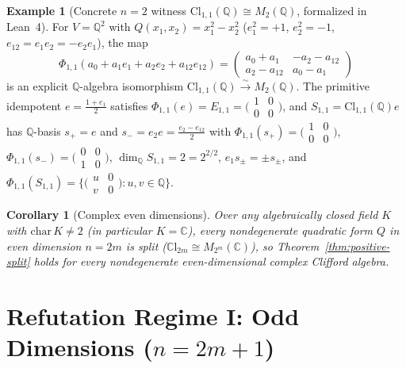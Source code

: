 \documentclass[11pt,a4paper]{article}
\theoremstyle{plain}
\newtheorem{corollary}[theorem]{Corollary}
\theoremstyle{definition}
\newtheorem{example}[theorem]{Example}
\theoremstyle{remark}
\newcommand{\Cl}{\mathrm{Cl}}
\newcommand{\CCl}{\mathbb{C}\mathrm{l}}
\begin{document}
\begin{example}[Concrete $n = 2$ witness $\Cl_{1,1}(\mathbb{Q}) \cong M_2(\mathbb{Q})$, formalized in Lean~4]\label{ex:cl11}
For $V = \mathbb{Q}^2$ with $Q(x_1, x_2) = x_1^2 - x_2^2$ ($e_1^2 = +1$, $e_2^2 = -1$, $e_{12} = e_1 e_2 = -e_2 e_1$), the map
\[
  \Phi_{1,1}(a_0 + a_1 e_1 + a_2 e_2 + a_{12} e_{12}) =
  \begin{pmatrix}
    a_0 + a_1 & -a_2 - a_{12} \\
    a_2 - a_{12} & a_0 - a_1
  \end{pmatrix}
\]
is an explicit $\mathbb{Q}$-algebra isomorphism $\Cl_{1,1}(\mathbb{Q}) \xrightarrow{\sim} M_2(\mathbb{Q})$. The primitive idempotent $e = \frac{1 + e_1}{2}$ satisfies $\Phi_{1,1}(e) = E_{1,1} = \bigl(\begin{smallmatrix}1&0\\0&0\end{smallmatrix}\bigr)$, and $S_{1,1} = \Cl_{1,1}(\mathbb{Q}) e$ has $\mathbb{Q}$-basis $s_+ = e$ and $s_- = e_2 e = \frac{e_2 - e_{12}}{2}$ with $\Phi_{1,1}(s_+) = \bigl(\begin{smallmatrix}1&0\\0&0\end{smallmatrix}\bigr)$, $\Phi_{1,1}(s_-) = \bigl(\begin{smallmatrix}0&0\\1&0\end{smallmatrix}\bigr)$, $\dim_{\mathbb{Q}} S_{1,1} = 2 = 2^{2/2}$, $e_1 s_\pm = \pm s_\pm$, and $\Phi_{1,1}(S_{1,1}) = \bigl\{\bigl(\begin{smallmatrix}u&0\\v&0\end{smallmatrix}\bigr) : u,v \in \mathbb{Q}\bigr\}$.
\end{example}

\begin{corollary}[Complex even dimensions]\label{cor:complex-even}
Over any algebraically closed field $K$ with $\mathrm{char}\,K \neq 2$ (in particular $K = \mathbb{C}$), every nondegenerate quadratic form $Q$ in even dimension $n = 2m$ is split ($\CCl_{2m} \cong M_{2^m}(\mathbb{C})$), so Theorem~\ref{thm:positive-split} holds for every nondegenerate even-dimensional complex Clifford algebra.
\end{corollary}

\section{Refutation Regime I: Odd Dimensions \texorpdfstring{($n = 2m + 1$)}{(n = 2m + 1)}}
\end{document}
